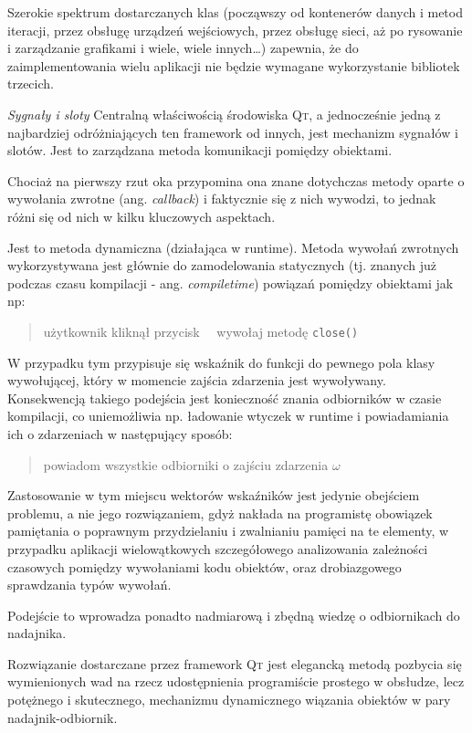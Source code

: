 Szerokie spektrum dostarczanych klas (począwszy od kontenerów danych i metod iteracji, przez obsługę urządzeń wejściowych, przez obsługę sieci, aż po rysowanie i zarządzanie grafikami i wiele, wiele innych\ldots) zapewnia, że do zaimplementowania wielu aplikacji nie będzie wymagane wykorzystanie bibliotek trzecich.

\textsl{Sygnały i sloty}
Centralną właściwością środowiska \textsc{Qt}, a jednocześnie jedną z najbardziej odróżniających ten framework od innych, jest mechanizm sygnałów i slotów. Jest to zarządzana metoda komunikacji pomiędzy obiektami.

Chociaż na pierwszy rzut oka przypomina ona znane dotychczas metody oparte o wywołania zwrotne (ang. \textsl{callback}) i faktycznie się z nich wywodzi, to jednak różni się od nich w kilku kluczowych aspektach.

Jest to metoda dynamiczna (działająca w runtime). Metoda wywołań zwrotnych wykorzystywana jest głównie do zamodelowania statycznych (tj. znanych już podczas czasu kompilacji - ang. \textsl{compiletime}) powiązań pomiędzy obiektami jak np:
\begin{verse}
użytkownik kliknął przycisk \texttimes~\textrightarrow~wywołaj metodę \texttt{close()}
\end{verse}

W przypadku tym przypisuje się wskaźnik do funkcji do pewnego pola klasy wywołującej, który w momencie zajścia zdarzenia jest wywoływany. Konsekwencją takiego podejścia jest konieczność znania odbiorników w czasie kompilacji, co uniemożliwia np. ładowanie wtyczek w runtime i powiadamiania ich o zdarzeniach w następujący sposób:
\begin{verse}
powiadom wszystkie odbiorniki o zajściu zdarzenia $\omega$
\end{verse}

Zastosowanie w tym miejscu wektorów wskaźników jest jedynie obejściem problemu, a nie jego rozwiązaniem, gdyż nakłada na programistę obowiązek pamiętania o poprawnym przydzielaniu i zwalnianiu pamięci na te elementy, w przypadku aplikacji wielowątkowych szczegółowego analizowania zależności czasowych pomiędzy wywołaniami kodu obiektów, oraz drobiazgowego sprawdzania typów wywołań.

Podejście to wprowadza ponadto nadmiarową i zbędną wiedzę o odbiornikach do nadajnika.

Rozwiązanie dostarczane przez framework \textsc{Qt} jest elegancką metodą pozbycia się wymienionych wad na rzecz udostępnienia programiście prostego w obsłudze, lecz potężnego i skutecznego, mechanizmu dynamicznego wiązania obiektów w pary nadajnik-odbiornik.

